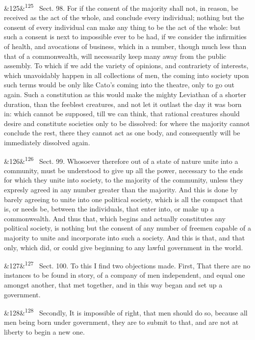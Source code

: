 \documentclass[12pt]{article}
\newcommand{\para}[1][]{\par\noindent\ifx&#1&\else\textsuperscript{\footnotesize #1}~\fi}
\begin{document}
\para[125] Sect. 98. For if the consent of the majority shall not, in reason, be received as the act of the whole, and conclude every individual; nothing but the consent of every individual can make any thing to be the act of the whole: but such a consent is next to impossible ever to be had, if we consider the infirmities of health, and avocations of business, which in a number, though much less than that of a commonwealth, will necessarily keep many away from the public assembly. To which if we add the variety of opinions, and contrariety of interests, which unavoidably happen in all collections of men, the coming into society upon such terms would be only like Cato's coming into the theatre, only to go out again. Such a constitution as this would make the mighty Leviathan of a shorter duration, than the feeblest creatures, and not let it outlast the day it was born in: which cannot be supposed, till we can think, that rational creatures should desire and constitute societies only to be dissolved: for where the majority cannot conclude the rest, there they cannot act as one body, and consequently will be immediately dissolved again.

\para[126] Sect. 99. Whosoever therefore out of a state of nature unite into a community, must be understood to give up all the power, necessary to the ends for which they unite into society, to the majority of the community, unless they expresly agreed in any number greater than the majority. And this is done by barely agreeing to unite into one political society, which is all the compact that is, or needs be, between the individuals, that enter into, or make up a commonwealth. And thus that, which begins and actually constitutes any political society, is nothing but the consent of any number of freemen capable of a majority to unite and incorporate into such a society. And this is that, and that only, which did, or could give beginning to any lawful government in the world.

\para[127] Sect. 100. To this I find two objections made. First, That there are no instances to be found in story, of a company of men independent, and equal one amongst another, that met together, and in this way began and set up a government.

\para[128] Secondly, It is impossible of right, that men should do so, because all men being born under government, they are to submit to that, and are not at liberty to begin a new one.
\end{document}

